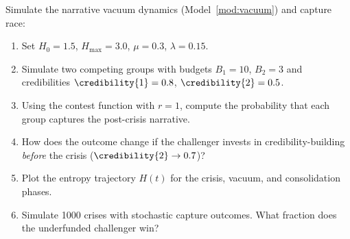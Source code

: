 \begin{exercise}[Computational]
Simulate the narrative vacuum dynamics (Model~\ref{mod:vacuum}) and capture race:
\begin{enumerate}[nosep]
  \item Set $H_0 = 1.5$, $H_{\max} = 3.0$, $\mu = 0.3$, $\lambda = 0.15$.
  \item Simulate two competing groups with budgets $B_1 = 10$, $B_2 = 3$ and credibilities $\credibility{1} = 0.8$, $\credibility{2} = 0.5$.
  \item Using the contest function with $r = 1$, compute the probability that each group captures the post-crisis narrative.
  \item How does the outcome change if the challenger invests in credibility-building \emph{before} the crisis ($\credibility{2} \to 0.7$)?
  \item Plot the entropy trajectory $H(t)$ for the crisis, vacuum, and consolidation phases.
  \item Simulate 1000 crises with stochastic capture outcomes. What fraction does the underfunded challenger win?
\end{enumerate}
\end{exercise}
